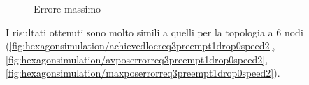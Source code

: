 \documentclass[Lau,binding=0.6cm]{sapthesis}
\begin{document}
\begin{figure}[H]
    \centering
    \hfill
    \caption{Errore massimo}
\end{figure}
I risultati ottenuti sono molto simili a quelli per la topologia a 6 nodi (\ref{fig:hexagonsimulation/achievedlocreq3preempt1drop0speed2}, \ref{fig:hexagonsimulation/avposerrorreq3preempt1drop0speed2}, \ref{fig:hexagonsimulation/maxposerrorreq3preempt1drop0speed2}).
\end{document}
